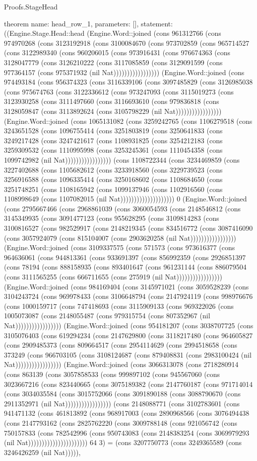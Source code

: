\begin{lexlean}{Proofs.StageHead}
\begin{semanticmodule}
theorem{
  name: head_row_1,
  parameters: [],
  statement: ((Engine.Stage.Head::head (Engine.Word::joined (cons 961312766 (cons 974970268 (cons 3123192918 (cons 3100084670 (cons 973702859 (cons 965714527 (cons 3122989340 (cons 960206015 (cons 973916431 (cons 976674363 (cons 3128047779 (cons 3126210222 (cons 3117085859 (cons 3129091599 (cons 977364157 (cons 975371932 (nil Nat))))))))))))))))) (Engine.Word::joined (cons 974493184 (cons 956374323 (cons 3116339106 (cons 3097485829 (cons 3126985038 (cons 975674763 (cons 3122336612 (cons 973247093 (cons 3115019273 (cons 3123930258 (cons 3111497660 (cons 3116693610 (cons 979836818 (cons 3128059847 (cons 3113892624 (cons 3105798229 (nil Nat))))))))))))))))) (Engine.Word::joined (cons 1065131082 (cons 3259242765 (cons 1106279518 (cons 3243651528 (cons 1096755414 (cons 3251803819 (cons 3250641833 (cons 3249217428 (cons 3247421617 (cons 1108931825 (cons 3254212183 (cons 3259309532 (cons 1110995998 (cons 3253245361 (cons 1110454358 (cons 1099742982 (nil Nat))))))))))))))))) (cons 1108722344 (cons 3234469859 (cons 3227402688 (cons 1105682612 (cons 3233918560 (cons 3229739523 (cons 3256916588 (cons 1096335414 (cons 3250168602 (cons 1108684650 (cons 3251748251 (cons 1108165942 (cons 1099137946 (cons 1102916560 (cons 1108998649 (cons 1107082015 (nil Nat)))))))))))))))))))) 0 (Engine.Word::joined (cons 2795667466 (cons 2968861039 (cons 3060054593 (cons 2148546812 (cons 3145349935 (cons 3091477123 (cons 955628295 (cons 3109814283 (cons 3100816527 (cons 982529917 (cons 2148219345 (cons 834516772 (cons 3087416090 (cons 3057924079 (cons 815104007 (cons 2903620258 (nil Nat))))))))))))))))) (Engine.Word::joined (cons 3109337575 (cons 571573 (cons 973616377 (cons 964636061 (cons 944813361 (cons 933691397 (cons 856992359 (cons 2926851397 (cons 78194 (cons 888158935 (cons 893401647 (cons 961231144 (cons 886079504 (cons 3111565255 (cons 666711655 (cons 275919 (nil Nat))))))))))))))))) (Engine.Word::joined (cons 984169404 (cons 3145971021 (cons 3059528239 (cons 3104243724 (cons 969978433 (cons 3106648794 (cons 2147924119 (cons 998976676 (cons 1000159717 (cons 747418693 (cons 3115909133 (cons 969322026 (cons 1005073087 (cons 2148055487 (cons 979315754 (cons 807352967 (nil Nat))))))))))))))))) (Engine.Word::joined (cons 954181207 (cons 3038707725 (cons 3105076403 (cons 619294234 (cons 2147629800 (cons 3118217480 (cons 964605827 (cons 2909485373 (cons 809664517 (cons 2954114629 (cons 2994518658 (cons 373249 (cons 966703105 (cons 3108124687 (cons 879408831 (cons 2983100424 (nil Nat))))))))))))))))) (Engine.Word::joined (cons 3066313078 (cons 2718280914 (cons 863139 (cons 3057858533 (cons 999897102 (cons 945567060 (cons 3023667216 (cons 823440665 (cons 3075189382 (cons 2147760187 (cons 971714014 (cons 3034035584 (cons 3015752066 (cons 3091890188 (cons 3088790670 (cons 2911352971 (nil Nat))))))))))))))))) (cons 2148088771 (cons 3102783601 (cons 941471132 (cons 461813892 (cons 968917003 (cons 2890968566 (cons 3076494438 (cons 2147793162 (cons 2825762220 (cons 3009788148 (cons 921056742 (cons 750157833 (cons 782542996 (cons 950743083 (cons 2148383254 (cons 3069979293 (nil Nat)))))))))))))))))))))) 64 3) = (cons 3207750773 (cons 3249365589 (cons 3246426259 (nil Nat))))),
}
\end{semanticmodule}
\end{lexlean}
